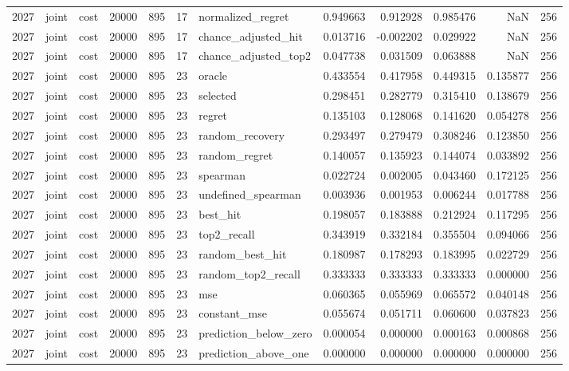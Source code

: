 \begin{tabular}{rllrrrlrrrrr}
2027 & joint & cost & 20000 & 895 & 17 & normalized_regret & 0.949663 & 0.912928 & 0.985476 & NaN & 256 \\
2027 & joint & cost & 20000 & 895 & 17 & chance_adjusted_hit & 0.013716 & -0.002202 & 0.029922 & NaN & 256 \\
2027 & joint & cost & 20000 & 895 & 17 & chance_adjusted_top2 & 0.047738 & 0.031509 & 0.063888 & NaN & 256 \\
2027 & joint & cost & 20000 & 895 & 23 & oracle & 0.433554 & 0.417958 & 0.449315 & 0.135877 & 256 \\
2027 & joint & cost & 20000 & 895 & 23 & selected & 0.298451 & 0.282779 & 0.315410 & 0.138679 & 256 \\
2027 & joint & cost & 20000 & 895 & 23 & regret & 0.135103 & 0.128068 & 0.141620 & 0.054278 & 256 \\
2027 & joint & cost & 20000 & 895 & 23 & random_recovery & 0.293497 & 0.279479 & 0.308246 & 0.123850 & 256 \\
2027 & joint & cost & 20000 & 895 & 23 & random_regret & 0.140057 & 0.135923 & 0.144074 & 0.033892 & 256 \\
2027 & joint & cost & 20000 & 895 & 23 & spearman & 0.022724 & 0.002005 & 0.043460 & 0.172125 & 256 \\
2027 & joint & cost & 20000 & 895 & 23 & undefined_spearman & 0.003936 & 0.001953 & 0.006244 & 0.017788 & 256 \\
2027 & joint & cost & 20000 & 895 & 23 & best_hit & 0.198057 & 0.183888 & 0.212924 & 0.117295 & 256 \\
2027 & joint & cost & 20000 & 895 & 23 & top2_recall & 0.343919 & 0.332184 & 0.355504 & 0.094066 & 256 \\
2027 & joint & cost & 20000 & 895 & 23 & random_best_hit & 0.180987 & 0.178293 & 0.183995 & 0.022729 & 256 \\
2027 & joint & cost & 20000 & 895 & 23 & random_top2_recall & 0.333333 & 0.333333 & 0.333333 & 0.000000 & 256 \\
2027 & joint & cost & 20000 & 895 & 23 & mse & 0.060365 & 0.055969 & 0.065572 & 0.040148 & 256 \\
2027 & joint & cost & 20000 & 895 & 23 & constant_mse & 0.055674 & 0.051711 & 0.060600 & 0.037823 & 256 \\
2027 & joint & cost & 20000 & 895 & 23 & prediction_below_zero & 0.000054 & 0.000000 & 0.000163 & 0.000868 & 256 \\
2027 & joint & cost & 20000 & 895 & 23 & prediction_above_one & 0.000000 & 0.000000 & 0.000000 & 0.000000 & 256 \\

\end{tabular}
